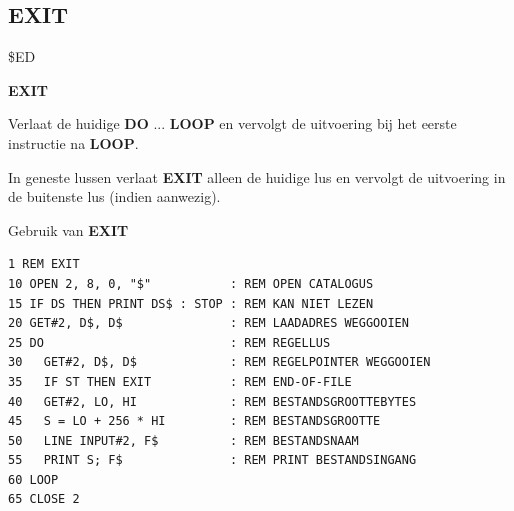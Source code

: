 \newpage
\subsection{EXIT}
\begin{description}[leftmargin=2cm,style=nextline]
\item [Token:]    \$ED

\item [Formaat:]   {\bf EXIT}

\item [Gebruik:]    Verlaat de huidige {\bf DO} ... {\bf LOOP} en vervolgt de uitvoering bij het eerste instructie na {\bf LOOP}.

\item [Opmerkingen:]  In geneste lussen verlaat {\bf EXIT} alleen de huidige lus en vervolgt de uitvoering in de buitenste lus (indien aanwezig).

\item [Voorbeeld:]  Gebruik van {\bf EXIT}

\begin{tcolorbox}[colback=black,coltext=white]
\verbatimfont{\codefont}
\begin{verbatim}
1 REM EXIT
10 OPEN 2, 8, 0, "$"           : REM OPEN CATALOGUS
15 IF DS THEN PRINT DS$ : STOP : REM KAN NIET LEZEN
20 GET#2, D$, D$               : REM LAADADRES WEGGOOIEN
25 DO                          : REM REGELLUS
30   GET#2, D$, D$             : REM REGELPOINTER WEGGOOIEN
35   IF ST THEN EXIT           : REM END-OF-FILE
40   GET#2, LO, HI             : REM BESTANDSGROOTTEBYTES
45   S = LO + 256 * HI         : REM BESTANDSGROOTTE
50   LINE INPUT#2, F$          : REM BESTANDSNAAM
55   PRINT S; F$               : REM PRINT BESTANDSINGANG
60 LOOP
65 CLOSE 2
\end{verbatim}
\end{tcolorbox}
\end{description}


\newpage
